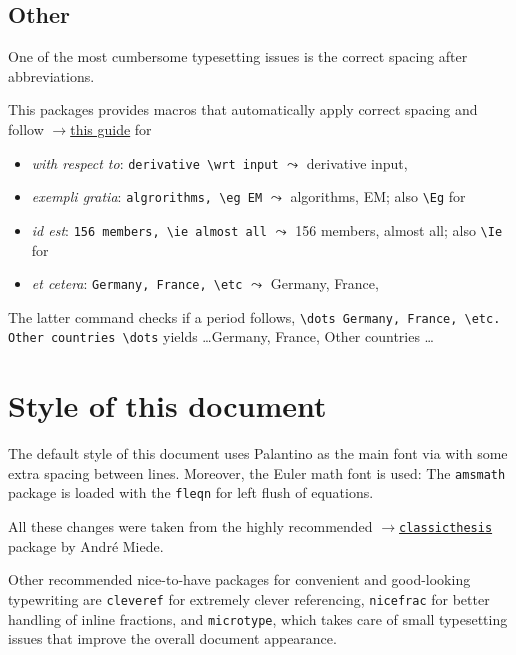 \documentclass
[
twoside, %
]
{article}
\begin{document}
\subsection{Other}
One of the most cumbersome typesetting issues is the correct spacing after abbreviations.

This packages provides macros that automatically apply correct spacing and follow \href{http://www.quickanddirtytips.com/education/grammar/ie-versus-eg?page=2}{$\rightarrow$this guide} for 
\begin{itemize}
	\item \emph{with respect to}: \texttt{derivative \textbackslash wrt input} $\leadsto$ derivative \wrt input,
	\item \emph{exempli gratia}: \texttt{algrorithms, \textbackslash eg EM} $\leadsto$ algorithms, \eg EM; also \texttt{\textbackslash Eg} for \Eg
	\item \emph{id est}: \texttt{156 members, \textbackslash ie almost all} $\leadsto$ 156 members, \ie almost all; also \texttt{\textbackslash Ie} for \Ie
	\item \emph{et cetera}: \texttt{Germany, France, \textbackslash etc} $\leadsto$ Germany, France, \etc
\end{itemize}
The latter command checks if a period follows, \ie \texttt{\textbackslash dots Germany, France, \textbackslash etc. Other countries \textbackslash dots} yields \dots Germany, France, \etc Other countries \dots

\section{Style of this document}
The default style of this document uses Palantino as the main font via  with some extra spacing between lines. Moreover, the Euler math font is used:  The \texttt{amsmath} package is loaded with the \texttt{fleqn} for left flush of equations. 

All these changes were taken from the highly recommended \href{https://bitbucket.org/amiede/classicthesis/wiki/Home}{$\rightarrow$\texttt{classicthesis}} package by Andr\'e Miede.

Other recommended nice-to-have packages for convenient and good-looking typewriting are \texttt{cleveref} for extremely clever referencing, \texttt{nicefrac} for better handling of inline fractions, and \texttt{microtype}, which takes care of small typesetting issues that improve the overall document appearance.
\end{document}
